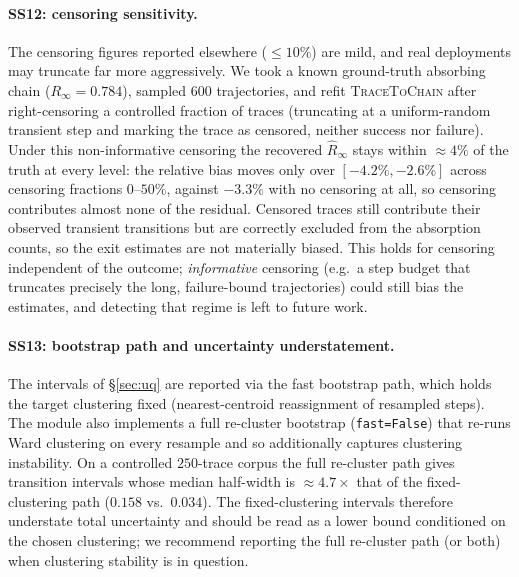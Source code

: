 

\paragraph{SS12: censoring sensitivity.}
The censoring figures reported elsewhere ($\le 10\%$) are mild, and real
deployments may truncate far more aggressively. We took a known ground-truth
absorbing chain ($R_\infty = 0.784$), sampled $600$ trajectories, and refit
\textsc{TraceToChain} after right-censoring a controlled fraction of traces
(truncating at a uniform-random transient step and marking the trace as
censored, neither success nor failure). Under this non-informative censoring the recovered
$\hat R_\infty$ stays within $\approx\!4\%$ of the truth at every level: the
relative bias moves only over $[-4.2\%, -2.6\%]$ across censoring fractions
$0$--$50\%$, against $-3.3\%$ with no censoring at all, so censoring
contributes almost none of the residual. Censored traces still contribute
their observed transient transitions but are correctly excluded from the
absorption counts, so the exit estimates are not materially biased. This
holds for censoring independent of the outcome; \emph{informative} censoring
(e.g.\ a step budget that truncates precisely the long, failure-bound
trajectories) could still bias the estimates, and detecting that regime is
left to future work.


\paragraph{SS13: bootstrap path and uncertainty understatement.}
The intervals of \S\ref{sec:uq} are reported via the fast bootstrap path, which
holds the target clustering fixed (nearest-centroid reassignment of resampled
steps). The module also implements a full re-cluster bootstrap
(\texttt{fast=False}) that re-runs Ward clustering on every resample and so
additionally captures clustering instability. On a controlled $250$-trace
corpus the full re-cluster path gives transition intervals whose median
half-width is $\approx\!4.7\times$ that of the fixed-clustering path ($0.158$
vs.\ $0.034$). The fixed-clustering intervals therefore understate total
uncertainty and should be read as a lower bound conditioned on the chosen
clustering; we recommend reporting the full re-cluster path (or both) when
clustering stability is in question.
